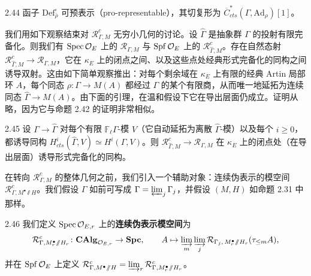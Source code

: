 \begin{prop}{2.44}
函子 $\mathrm{Def}^\square_{\bar\rho}$ 可预表示（pro-representable），其切复形为 $\overline{C}^*_{cts}(\Gamma,\mathrm{Ad}_\rho)[1]$。
\label{prop:zhu2-2-44}
\end{prop}

我们用如下观察结束对 $\mathcal R^c_{\Gamma,M}$ 无穷小几何的讨论。设 $\widehat\Gamma$ 是抽象群 $\Gamma$ 的投射有限完备化。则我们有 $\operatorname{Spec}\mathcal O_E$ 上的 $\mathcal R_{\Gamma,M}$ 与 $\operatorname{Spf}\mathcal O_E$ 上的 $\mathcal R^c_{\widehat\Gamma,M}$。存在自然态射 $\mathcal R^c_{\widehat\Gamma,M} \to \mathcal R_{\Gamma,M}$，它在 $\kappa_E$ 上的闭点之间、以及这些点处经典形式完备化的同构之间诱导双射。这由如下简单观察推出：对每个剩余域在 $\kappa_E$ 上有限的经典 Artin 局部环 $A$，每个同态 $\rho\colon \Gamma \to M(A)$ 都经过 $\Gamma$ 的某个有限商，从而唯一地延拓为连续同态 $\widehat\Gamma \to M(A)$。由下面的引理，在温和假设下它在导出层面仍成立。证明从略，因为它与命题 2.42 的证明非常相似。

\begin{lem}{2.45}
设 $\Gamma \to \widehat\Gamma$ 对每个有限 $\mathbb F_\ell\Gamma$-模 $V$（它自动延拓为离散 $\widehat\Gamma$-模）以及每个 $i \ge 0$，都诱导同构 $H^i_{cts}(\widehat\Gamma, V) \simeq H^i(\Gamma, V)$。则 $\mathcal R^c_{\widehat\Gamma,M} \to \mathcal R_{\Gamma,M}$ 在 $\kappa_E$ 上的闭点处（在导出层面）诱导形式完备化的同构。
\label{lem:zhu2-2-45}
\end{lem}

在转向 $\mathcal R^c_{\Gamma,M}$ 的整体几何之前，我们引入一个辅助对象：连续伪表示的模空间 $\mathcal R^c_{\Gamma,M^\bullet\sslash H}$。我们假设 $\Gamma$ 如前可写成 $\Gamma = \varprojlim_j \Gamma_j$，并假设 $(M,H)$ 如命题 2.31 中那样。

\begin{defn}{2.46}
我们定义 $\operatorname{Spec}\mathcal O_{E,r}$ 上的\textbf{连续伪表示模空间}为
\[
\mathcal R^c_{\Gamma,M^\bullet_r\sslash H_r}\colon \mathbf{CAlg}_{\mathcal O_{E,r}} \to \mathbf{Spc},\qquad
A \mapsto \varinjlim_m\varinjlim_j \mathcal R_{\Gamma_j,\,M^\bullet_r\sslash H_r}(\tau_{\le m}A),
\]
并在 $\operatorname{Spf}\mathcal O_E$ 上定义 $\mathcal R^c_{\Gamma,M^\bullet\sslash H} = \varinjlim_r \mathcal R^c_{\Gamma,M^\bullet_r\sslash H_r}$。
\label{def:zhu2-2-46}
\end{defn}

